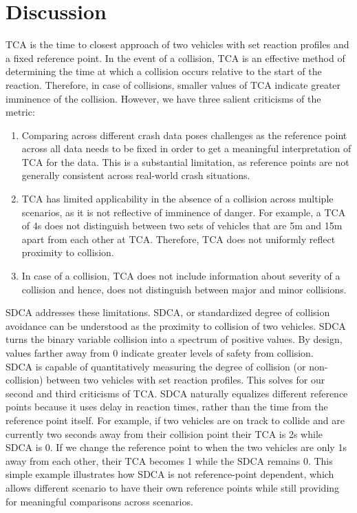 \documentclass{article}
\begin{document}
\section{Discussion}

TCA is the time to closest approach of two vehicles with set reaction profiles and a fixed reference point. In the event of a collision, TCA is an effective method of determining the time at which a collision occurs relative to the start of the reaction. Therefore, in case of collisions, smaller values of TCA indicate greater imminence of the collision. However, we have three salient criticisms of the metric:
\begin{enumerate}
    \item Comparing across different crash data poses challenges as the reference point across all data needs to be fixed in order to get a meaningful interpretation of TCA for the data. This is a substantial limitation, as reference points are not generally consistent across real-world crash situations.
    \item TCA has limited applicability in the absence of a collision across multiple scenarios, as it is not reflective of imminence of danger. For example, a TCA of 4s does not distinguish between two sets of vehicles that are 5m and 15m apart from each other at TCA. Therefore, TCA does not uniformly reflect proximity to collision.
    \item In case of a collision, TCA does not include information about severity of a collision and hence, does not distinguish between major and minor collisions.
\end{enumerate}
SDCA addresses these limitations. SDCA, or standardized degree of collision avoidance can be understood as the proximity to collision of two vehicles. SDCA turns the binary variable collision into a spectrum of positive values. By design, values farther away from 0 indicate greater levels of safety from collision.\\ SDCA is capable of quantitatively measuring the degree of collision (or non-collision) between two vehicles with set reaction profiles. This solves for our second and third criticisms of TCA. SDCA naturally equalizes different reference points because it uses delay in reaction times, rather than the time from the reference point itself. For example, if two vehicles are on track to collide and are currently two seconds away from their collision point their TCA is 2s while SDCA is 0. If we change the reference point to when the two vehicles are only 1s away from each other, their TCA becomes 1 while the SDCA remains 0. This simple example illustrates how SDCA is not reference-point dependent, which allows different scenario to have their own reference points while still providing for meaningful comparisons across scenarios.\\
\end{document}
